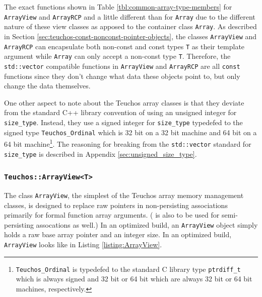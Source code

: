 \documentclass[pdf,ps2pdf,11pt]{SANDreport}
\begin{document}
The exact functions shown in Table
{}\ref{tbl:common-array-type-members} for {}\texttt{ArrayView} and
{}\texttt{ArrayRCP} and a little different than for {}\texttt{Array}
due to the different nature of these view classes as apposed to the
container class {}\texttt{Array}.  As described in Section
{}\ref{sec:teuchos-const-nonconst-pointer-objects}, the classes
{}\texttt{ArrayView} and {}\texttt{ArrayRCP} can encapsulate both
non-const and const types {}\texttt{T} as their template argument
while {}\texttt{Array} can only accept a non-const type {}\texttt{T}.
Therefore, the {}\texttt{std::vector} compatible functions in
{}\texttt{ArrayView} and {}\texttt{ArrayRCP} are all {}\texttt{const}
functions since they don't change what data these objects point to,
but only change the data themselves.

One other aspect to note about the Teuchos array classes is that they
deviate from the standard C++ library convention of using an unsigned
integer for {}\texttt{size\_type}.  Instead, they use a signed integer
for {}\texttt{size\_type} typedefed to the signed type
{}\texttt{Teuchos\_Ordinal} which is 32 bit on a 32 bit machine and 64
bit on a 64 bit machine\footnote{{}\texttt{Teuchos\_Ordinal} is
typedefed to the standard C library type {}\texttt{ptrdiff\_t} which
is always signed and 32 bit or 64 bit which are always 32 bit or 64
bit machines, respectively.}.  The reasoning for breaking from the
{}\texttt{std::vector} standard for {}\texttt{size\_type} is described
in Appendix {}\ref{sec:unsigned_size_type}.


%
{}\subsubsection{\texttt{Teuchos::ArrayView<T>}}
%

The class {}\texttt{ArrayView}, the simplest of the Teuchos array
memory management classes, is designed to replace raw pointers in
non-persisting associations primarily for formal function array
arguments.  ({} is also to be used for semi-persisting
assocations as well.)  In an optimized build, an {}\texttt{ArrayView}
object simply holds a raw base array pointer and an integer size.  In
an optimized build, {}\texttt{ArrayView} looks like in Listing
{}\ref{listing:ArrayView}.
\end{document}
